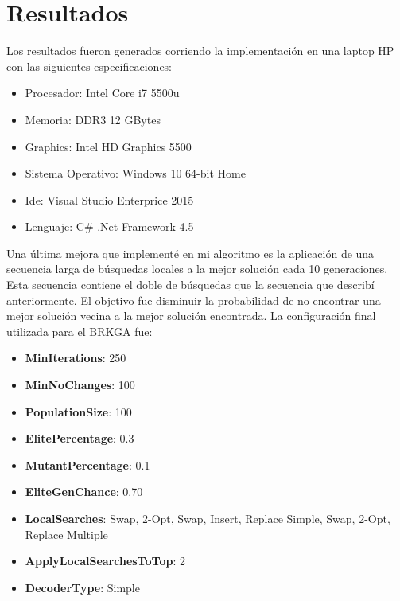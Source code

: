 \chapter{Resultados}

Los resultados fueron generados corriendo la implementación en una laptop HP con las siguientes especificaciones:

\begin{itemize}
  \item Procesador: Intel Core i7 5500u
  \item Memoria: DDR3 12 GBytes
  \item Graphics: Intel HD Graphics 5500
  \item Sistema Operativo: Windows 10 64-bit Home
  \item Ide: Visual Studio Enterprice 2015
  \item Lenguaje: C\# .Net Framework 4.5
\end{itemize}

\bigskip

Una última mejora que implementé en mi algoritmo es la aplicación de una secuencia larga de búsquedas locales a la mejor solución cada 10 generaciones. Esta secuencia contiene el doble de búsquedas que la secuencia que describí anteriormente. El objetivo fue disminuir la probabilidad de no encontrar una mejor solución vecina a la mejor solución encontrada. La configuración final utilizada para el BRKGA fue:

\begin{itemize}
  \item \textbf{MinIterations}: 250
  \item \textbf{MinNoChanges}: 100
  \item \textbf{PopulationSize}: 100
  \item \textbf{ElitePercentage}: 0.3 
  \item \textbf{MutantPercentage}: 0.1
  \item \textbf{EliteGenChance}: 0.70 
  \item \textbf{LocalSearches}: Swap, 2-Opt, Swap, Insert, Replace Simple, Swap, 2-Opt, Replace Multiple
  \item \textbf{ApplyLocalSearchesToTop}: 2
  \item \textbf{DecoderType}: Simple
\end{itemize}

\bigskip

